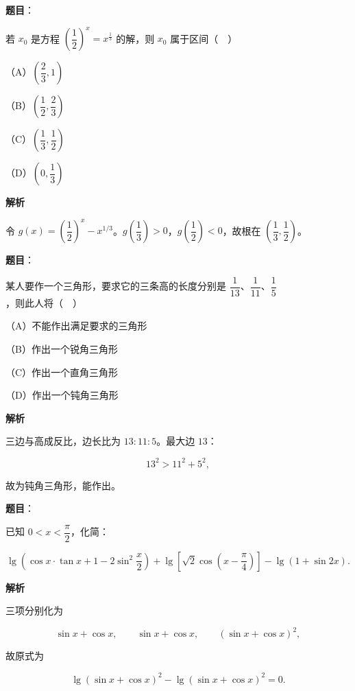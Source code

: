 \begin{answer}

\textbf{题目}：

若 $x_0$ 是方程 $\left(\dfrac12\right)^x=x^{\frac13}$ 的解，则 $x_0$ 属于区间（　）

（A）$\left(\dfrac23,1\right)$

（B）$\left(\dfrac12,\dfrac23\right)$

（C）$\left(\dfrac13,\dfrac12\right)$

（D）$\left(0,\dfrac13\right)$

\textbf{解析}

令 $g(x)=\left(\dfrac12\right)^x-x^{1/3}$。$g\left(\dfrac13\right)>0$，$g\left(\dfrac12\right)<0$，故根在 $\left(\dfrac13,\dfrac12\right)$。


\end{answer}
\begin{answer}

\textbf{题目}：

某人要作一个三角形，要求它的三条高的长度分别是 $\dfrac1{13}$、$\dfrac1{11}$、$\dfrac15$，则此人将（　）

（A）不能作出满足要求的三角形

（B）作出一个锐角三角形

（C）作出一个直角三角形

（D）作出一个钝角三角形

\textbf{解析}

三边与高成反比，边长比为 $13:11:5$。最大边 $13$：

\nopagebreak[4]
\[13^2>11^2+5^2,\]

故为钝角三角形，能作出。


\end{answer}
\begin{answer}

\textbf{题目}：

已知 $0<x<\dfrac\pi2$，化简：

\nopagebreak[4]
\[\lg\left(\cos x\cdot\tan x+1-2\sin^2\frac x2\right)
+\lg\left[\sqrt2\cos\left(x-\frac\pi4\right)\right]
-\lg(1+\sin2x).\]

\textbf{解析}

三项分别化为

\nopagebreak[4]
\[\sin x+\cos x,\qquad \sin x+\cos x,\qquad (\sin x+\cos x)^2,\]

故原式为

\nopagebreak[4]
\[\lg(\sin x+\cos x)^2-\lg(\sin x+\cos x)^2=0.\]


\end{answer}
